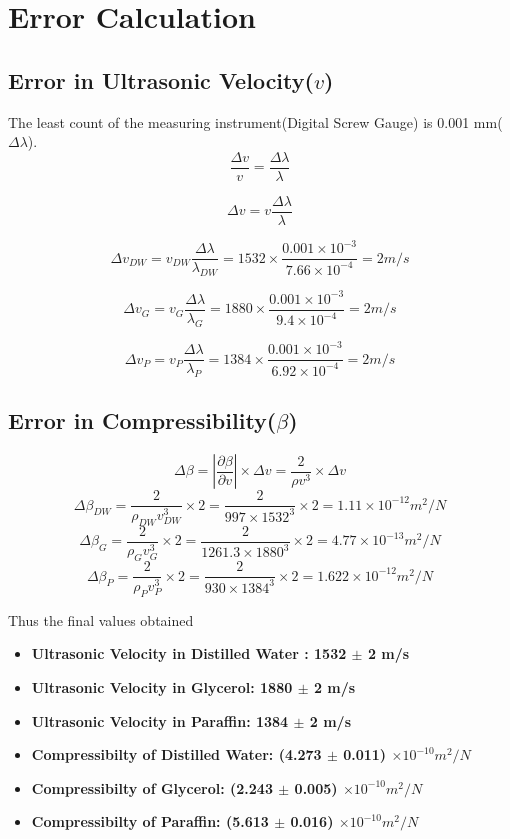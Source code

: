 \section{Error Calculation}
\subsection{Error in Ultrasonic Velocity($v$)}
The least count of the measuring instrument(Digital Screw Gauge) is 0.001 mm($\Delta \lambda$).
\[
\frac{\Delta v}{v} = \frac{\Delta \lambda}{\lambda} \]

\[\Delta v = v \frac{\Delta \lambda}{\lambda}
\]

\[\Delta v_{DW} = v_{DW} \frac{\Delta \lambda}{\lambda_{DW}} = 1532 \times \frac{0.001 \times 10^{-3}}{7.66 \times 10^{-4}} = 2 m/s  \]

\[\Delta v_{G} = v_{G} \frac{\Delta \lambda}{\lambda_{G}} = 1880 \times \frac{0.001 \times 10^{-3}}{9.4 \times 10^{-4}} = 2 m/s  \]

\[\Delta v_{P} = v_{P} \frac{\Delta \lambda}{\lambda_{P}} = 1384 \times \frac{0.001 \times 10^{-3}}{6.92\times 10^{-4}} = 2 m/s  \]
\subsection{Error in Compressibility($\beta$)}
\[\Delta \beta = | \frac{\partial \beta}{\partial v}| \times \Delta v = 
 \frac{2}{\rho v^3} \times \Delta v \]
\[\Delta \beta_{DW} = \frac{2}{\rho_{DW} v_{DW}^3} \times 2 = \frac{2}{997 \times 1532^3} \times 2 =1.11 \times 10^{-12 }m^2/N \]
\[\Delta \beta_{G} = \frac{2}{\rho_{G} v_{G}^3}\times 2 = \frac{2}{1261.3 \times 1880^3}\times 2  = 4.77 \times 10^{-13} m^2/N \]
\[\Delta \beta_{P} = \frac{2}{\rho_{P} v_{P}^3}\times 2 = \frac{2}{930 \times 1384^3}\times 2  = 1.622 \times 10^{-12} m^2/N \]

Thus the final values obtained 
\begin{itemize}
    \item \textbf{Ultrasonic Velocity in Distilled Water : 1532 $\pm$ 2 m/s }
    \item \textbf{Ultrasonic Velocity in Glycerol: 1880 $\pm$ 2 m/s}
    \item \textbf{Ultrasonic Velocity in Paraffin: 1384 $\pm$ 2 m/s}
    \item  \textbf{Compressibilty of Distilled Water: (4.273 $\pm$ 0.011) $\times 10^{-10} m^2/N $ }
    \item  \textbf{Compressibilty of Glycerol: (2.243 $\pm$ 0.005) $\times 10^{-10} m^2/N $ }
    \item  \textbf{Compressibilty of Paraffin: (5.613 $\pm$ 0.016) $\times 10^{-10} m^2/N $ }
\end{itemize}


